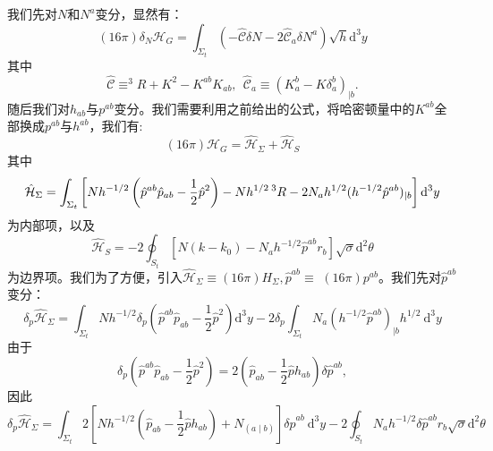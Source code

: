 \documentclass[hyperref, UTF8, a4paper]{ctexart}
\begin{document}
我们先对$N$和$N^{a}$变分，显然有：
\begin{equation*}
	( 16\pi ) \delta _{N}\mathcal{H}_{G} =\int _{\Sigma _{t}}\left( -\hat{\mathcal{C}} \delta N-2\hat{\mathcal{C}}_{a} \delta N^{a}\right)\sqrt{h}\mathrm{d}^{3} y
\end{equation*}
其中
\begin{equation*}
	\boxed{\hat{\mathcal{C}} \equiv ^{3} R+K^{2} -K^{ab} K_{ab} ,\ \ \hat{\mathcal{C}}_{a} \equiv (K_{a}^{b} -K\delta _{a}^{b} )_{\mid b}} .
\end{equation*}
随后我们对$h_{ab}$与$p^{ab}$变分。我们需要利用之前给出的公式，将哈密顿量中的$K^{ab}$全部换成$p^{ab}$与$h^{ab}$，我们有:
\begin{equation*}
	(16\pi )\mathcal{H}_{G} =\hat{\mathcal{H}}_{\Sigma } +\hat{\mathcal{H}}_{S}
\end{equation*}
其中
\begin{equation*}
	\hat{\mathcal{H}}_{\Sigma } =\int _{\Sigma _{t}}\left[ Nh^{-1/2}\left(\hat{p}^{ab}\hat{p}_{ab} -\frac{1}{2}\hat{p}^{2}\right) -Nh^{1/2}\prescript{3}{}{} R-2N_{a} h^{1/2} (h^{-1/2}\hat{p}^{ab} )_{\mid b}\right]\mathrm{d}^{3} y
\end{equation*}
为内部项，以及
\begin{equation*}
	\hat{\mathcal{H}}_{S} =-2\oint _{S_{t}}\left[ N( k-k_{0}) -N_{a} h^{-1/2}\hat{p}^{ab} r_{b}\right]\sqrt{\sigma }\mathrm{d}^{2} \theta 
\end{equation*}
为边界项。我们为了方便，引入$\hat{\mathcal{H}}_{\Sigma } \equiv (16\pi )H_{\Sigma } ,\hat{p}^{ab} \equiv $ $(16\pi )p^{ab}$。我们先对$\hat{p}^{ab}$变分：
\begin{equation*}
	\delta _{p}\hat{\mathcal{H}}_{\Sigma } =\int _{\Sigma _{t}} Nh^{-1/2} \delta _{p}\left(\hat{p}^{ab}\hat{p}_{ab} -\frac{1}{2}\hat{p}^{2}\right)\mathrm{d}^{3} y-2\delta _{p}\int _{\Sigma _{t}} N_{a} (h^{-1/2}\hat{p}^{ab} )_{\mid b} h^{1/2} \ \mathrm{d}^{3} y
\end{equation*}
由于
\begin{equation*}
	\delta _{p}\left(\hat{p}^{ab}\hat{p}_{ab} -\frac{1}{2}\hat{p}^{2}\right) =2\left(\hat{p}_{ab} -\frac{1}{2}\hat{p} h_{ab}\right) \delta \hat{p}^{ab} ,
\end{equation*}
因此
\begin{equation*}
	\delta _{p}\hat{\mathcal{H}}_{\Sigma } =\int _{\Sigma _{t}} 2\left[ Nh^{-1/2}\left(\hat{p}_{ab} -\frac{1}{2}\hat{p} h_{ab}\right) +N_{(a\mid b)}\right] \delta \hat{p}^{ab} \ \mathrm{d}^{3} y-2\oint _{S_{t}} N_{a} h^{-1/2} \delta \hat{p}^{ab} r_{b}\sqrt{\sigma }\mathrm{d}^{2} \theta 
\end{equation*}
\end{document}
